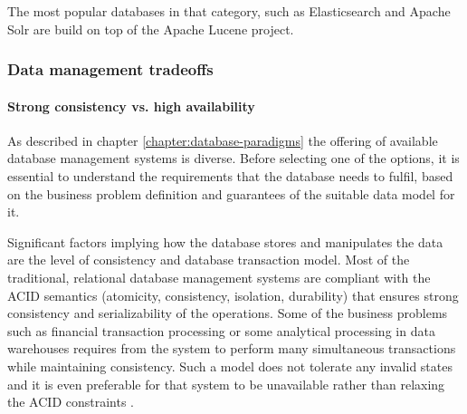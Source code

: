 The most popular databases in that category, such as Elasticsearch \cite{Elasticsearch} and Apache Solr \cite{ApacheSolr} are build on top of the Apache Lucene project.

\subsubsection{Data management tradeoffs}



\paragraph{Strong consistency vs. high availability} \label{chapter:database-management-tradeoffs}

As described in chapter \ref{chapter:database-paradigms} the offering of available database management systems is diverse. Before selecting one of the options, it is essential to understand the requirements that the database needs to fulfil, based on the business problem definition and guarantees of the suitable data model for it. 

Significant factors implying how the database stores and manipulates the data are the level of consistency and database transaction model. Most of the traditional, relational database management systems are compliant with the ACID semantics (atomicity, consistency, isolation, durability) that ensures strong consistency and serializability of the operations. Some of the business problems such as financial transaction processing or some analytical processing in data warehouses requires from the system to perform many simultaneous transactions while maintaining consistency. Such a model does not tolerate any invalid states and it is even preferable for that system to be unavailable rather than relaxing the ACID constraints \cite{PerspectivesOnArchitectureEvolution}.


